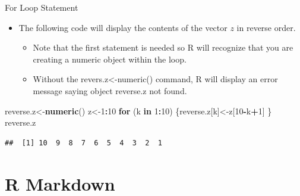 \documentclass[
  ignorenonframetext,
]{beamer}
\newenvironment{Shaded}{\begin{snugshade}}{\end{snugshade}}
\newcommand{\ControlFlowTok}[1]{\textcolor[rgb]{0.13,0.29,0.53}{\textbf{#1}}}
\newcommand{\DecValTok}[1]{\textcolor[rgb]{0.00,0.00,0.81}{#1}}
\newcommand{\FunctionTok}[1]{\textcolor[rgb]{0.13,0.29,0.53}{\textbf{#1}}}
\newcommand{\NormalTok}[1]{#1}
\newcommand{\OtherTok}[1]{\textcolor[rgb]{0.56,0.35,0.01}{#1}}
\newcommand{\SpecialCharTok}[1]{\textcolor[rgb]{0.81,0.36,0.00}{\textbf{#1}}}
\providecommand{\tightlist}{%
  \setlength{\itemsep}{0pt}\setlength{\parskip}{0pt}}
\begin{document}
\begin{frame}[fragile]{For Loop Statement}
\protect\hypertarget{for-loop-statement-2}{}
\begin{itemize}
\item
  The following code will display the contents of the vector \(z\) in
  reverse order.

  \begin{itemize}
  \tightlist
  \item
    Note that the first statement is needed so R will recognize that you
    are creating a numeric object within the loop.
  \item
    Without the revers.z\textless-numeric() command, R will display an
    error message saying object reverse.z not found.
  \end{itemize}
\end{itemize}

\small

\begin{Shaded}
\begin{Highlighting}[]
\NormalTok{reverse.z}\OtherTok{\textless{}{-}}\FunctionTok{numeric}\NormalTok{()}
\NormalTok{z}\OtherTok{\textless{}{-}}\DecValTok{1}\SpecialCharTok{:}\DecValTok{10}
\ControlFlowTok{for}\NormalTok{ (k }\ControlFlowTok{in} \DecValTok{1}\SpecialCharTok{:}\DecValTok{10}\NormalTok{)}
\NormalTok{\{reverse.z[k]}\OtherTok{\textless{}{-}}\NormalTok{z[}\DecValTok{10}\SpecialCharTok{{-}}\NormalTok{k}\SpecialCharTok{+}\DecValTok{1}\NormalTok{]}
\NormalTok{\}}
\NormalTok{reverse.z}
\end{Highlighting}
\end{Shaded}

\begin{verbatim}
##  [1] 10  9  8  7  6  5  4  3  2  1
\end{verbatim}

\normalsize
\end{frame}

\hypertarget{r-markdown}{%
\section{R Markdown}\label{r-markdown}}
\end{document}
